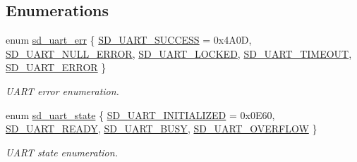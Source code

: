\subsection*{Enumerations}
\begin{DoxyCompactItemize}
\item 
enum \mbox{\hyperlink{group___s_d___u_a_r_t___types_gaff649a266fb34035c10733370c4fd104}{sd\+\_\+uart\+\_\+err}} \{ \newline
\mbox{\hyperlink{group___s_d___u_a_r_t___types_ggaff649a266fb34035c10733370c4fd104a3b6fe085405a5d58c55226fd59f01994}{S\+D\+\_\+\+U\+A\+R\+T\+\_\+\+S\+U\+C\+C\+E\+SS}} = 0x4\+A0D, 
\mbox{\hyperlink{group___s_d___u_a_r_t___types_ggaff649a266fb34035c10733370c4fd104a5c517833fd066aef16573f7c2b2074d7}{S\+D\+\_\+\+U\+A\+R\+T\+\_\+\+N\+U\+L\+L\+\_\+\+E\+R\+R\+OR}}, 
\mbox{\hyperlink{group___s_d___u_a_r_t___types_ggaff649a266fb34035c10733370c4fd104a81ad9d26004338f6c20d9a1ed5232662}{S\+D\+\_\+\+U\+A\+R\+T\+\_\+\+L\+O\+C\+K\+ED}}, 
\mbox{\hyperlink{group___s_d___u_a_r_t___types_ggaff649a266fb34035c10733370c4fd104ad8bcfd031fb4c8ac0aa58c93caa762fd}{S\+D\+\_\+\+U\+A\+R\+T\+\_\+\+T\+I\+M\+E\+O\+UT}}, 
\newline
\mbox{\hyperlink{group___s_d___u_a_r_t___types_ggaff649a266fb34035c10733370c4fd104ad77d98472c0c3bb192d745b3389de08d}{S\+D\+\_\+\+U\+A\+R\+T\+\_\+\+E\+R\+R\+OR}}
 \}
\begin{DoxyCompactList}\small\item\em U\+A\+RT error enumeration. \end{DoxyCompactList}\item 
enum \mbox{\hyperlink{group___s_d___u_a_r_t___types_gaf0b8536f812b898a674880b74843b6da}{sd\+\_\+uart\+\_\+state}} \{ \mbox{\hyperlink{group___s_d___u_a_r_t___types_ggaf0b8536f812b898a674880b74843b6daadafe99b07be259fa9947e53328dc6971}{S\+D\+\_\+\+U\+A\+R\+T\+\_\+\+I\+N\+I\+T\+I\+A\+L\+I\+Z\+ED}} = 0x0\+E60, 
\mbox{\hyperlink{group___s_d___u_a_r_t___types_ggaf0b8536f812b898a674880b74843b6daaf3ac24421836c364dac2457b4e372240}{S\+D\+\_\+\+U\+A\+R\+T\+\_\+\+R\+E\+A\+DY}}, 
\mbox{\hyperlink{group___s_d___u_a_r_t___types_ggaf0b8536f812b898a674880b74843b6daaeffe20252fc5296a07d2ff193c237449}{S\+D\+\_\+\+U\+A\+R\+T\+\_\+\+B\+U\+SY}}, 
\mbox{\hyperlink{group___s_d___u_a_r_t___types_ggaf0b8536f812b898a674880b74843b6daa47a675bb82ac0be6f8b60102821e2729}{S\+D\+\_\+\+U\+A\+R\+T\+\_\+\+O\+V\+E\+R\+F\+L\+OW}}
 \}
\begin{DoxyCompactList}\small\item\em U\+A\+RT state enumeration. \end{DoxyCompactList}\end{DoxyCompactItemize}


